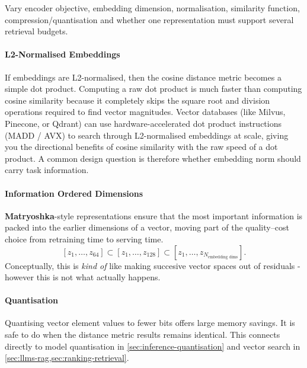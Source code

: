 \begin{calloutdegreeofexperiment}
Vary encoder objective, embedding dimension, normalisation, similarity function, compression/quantisation and whether one representation must support several retrieval budgets.
\end{calloutdegreeofexperiment}

\paragraph{L2-Normalised Embeddings}
If embeddings are L2-normalised, then the cosine distance metric becomes a simple dot product.
Computing a raw dot product is much faster than computing cosine similarity because it completely skips the square root and division operations required to find vector magnitudes.
Vector databases (like Milvus, Pinecone, or Qdrant) can use hardware-accelerated dot product instructions (MADD / AVX) to search through L2-normalised embeddings at scale, giving you the directional benefits of cosine similarity with the raw speed of a dot product.
A common design question is therefore whether embedding norm should carry task information.


\paragraph{Information Ordered Dimensions}
\textbf{Matryoshka}-style representations ensure that the most important information is packed into the earlier dimensions of a vector, moving part of the quality--cost choice from retraining time to serving time.
\[
    [z_1,\ldots,z_{64}]
    \subset
    [z_1,\ldots,z_{128}]
    \subset
    [z_1,\ldots,z_{N_{\text{embedding dims}}}].
\]
Conceptually, this is \textit{kind of} like making succesive vector spaces out of residuals - however this is not what actually happens.

\paragraph{Quantisation}
Quantising vector element values to fewer bits offers large memory savings.
It is safe to do when the distance metric results remains identical.
This connects directly to model quantisation in \cref{sec:inference-quantisation} and vector search in \cref{sec:llms-rag,sec:ranking-retrieval}.

